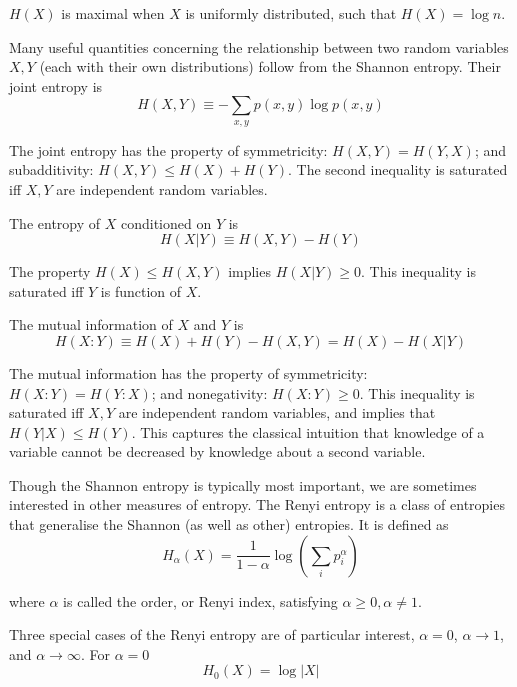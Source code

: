 \documentclass[10pt]{article}
\begin{document}
$H(X)$ is maximal when $X$ is uniformly distributed, such that $H(X) = \log{n}$. 

Many useful quantities concerning the relationship between two random variables $X,Y$ (each with their own distributions) follow from the Shannon entropy. Their joint entropy is
\begin{equation}
H(X,Y) \equiv - \sum_{x,y} p(x,y) \log p(x,y)
\end{equation}

The joint entropy has the property of symmetricity: $H(X,Y) = H(Y,X)$; and subadditivity: $H(X,Y) \leq H(X) + H(Y)$. The second inequality is saturated iff $X,Y$ are independent random variables.

The entropy of $X$ conditioned on $Y$ is
\begin{equation}
H(X|Y) \equiv H(X,Y) - H(Y)
\end{equation}

The property $H(X) \leq H(X,Y)$ implies $H(X|Y) \geq 0$. This inequality is saturated iff $Y$ is function of $X$. 

The mutual information of $X$ and $Y$ is
\begin{equation}
H(X:Y) \equiv H(X) + H(Y) - H(X,Y) = H(X) - H(X|Y)
\end{equation}

The mutual information has the property of symmetricity: $H(X:Y) = H(Y:X)$; and nonegativity: $H(X:Y) \geq 0$. This inequality is saturated iff $X,Y$ are independent random variables, and implies that $H(Y|X) \leq H(Y)$. This captures the classical intuition that knowledge of a variable cannot be decreased by knowledge about a second variable. 

Though the Shannon entropy is typically most important, we are sometimes interested in other measures of entropy. The Renyi entropy is a class of entropies that generalise the Shannon (as well as other) entropies. It is defined as
\begin{equation}
H_\alpha(X) = \frac{1}{1-\alpha} \log\left(\sum_i p_i^\alpha\right)
\end{equation}

where $\alpha$ is called the order, or Renyi index, satisfying $\alpha \geq 0, \alpha \neq 1$.

Three special cases of the Renyi entropy are of particular interest, $\alpha=0$, $\alpha\rightarrow1$, and $\alpha\rightarrow\infty$. For $\alpha=0$
\begin{equation}
H_0(X) = \log{|X|}
\end{equation}
\end{document}
